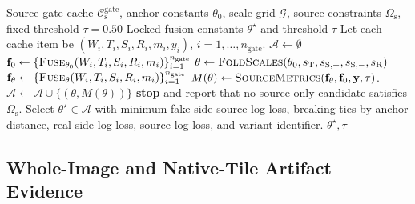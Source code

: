 \documentclass[letterpaper,journal]{IEEEtran}
\begin{document}
\begin{algorithm}[t]
\caption{Source-only fusion calibration}
\label{alg:source_locking}
\begin{algorithmic}[1]
\REQUIRE Source-gate cache $\mathcal{C}_{\mathrm{s}}^{\mathrm{gate}}$, anchor constants $\theta_0$, scale grid $\mathcal{G}$, source constraints $\Omega_{\mathrm{s}}$, fixed threshold $\tau=0.50$
\ENSURE Locked fusion constants $\theta^\star$ and threshold $\tau$
\STATE Let each cache item be $(W_i,T_i,S_i,R_i,m_i,y_i)$, $i=1,\ldots,n_{\mathrm{gate}}$.
\STATE $\mathcal{A}\leftarrow\emptyset$
\STATE $\mathbf{f}_{0}\leftarrow\{\textsc{Fuse}_{\theta_0}(W_i,T_i,S_i,R_i,m_i)\}_{i=1}^{n_{\mathrm{gate}}}$
    \STATE $\theta\leftarrow\textsc{FoldScales}(\theta_0,s_{\mathrm{T}},s_{\mathrm{S},+},s_{\mathrm{S},-},s_{\mathrm{R}})$
    \STATE $\mathbf{f}_{\theta}\leftarrow\{\textsc{Fuse}_{\theta}(W_i,T_i,S_i,R_i,m_i)\}_{i=1}^{n_{\mathrm{gate}}}$
    \STATE $M(\theta)\leftarrow\textsc{SourceMetrics}(\mathbf{f}_{\theta},\mathbf{f}_{0},\mathbf{y},\tau)$.
        \STATE $\mathcal{A}\leftarrow\mathcal{A}\cup\{(\theta,M(\theta))\}$
    \ENDIF
\ENDFOR
{}
    \STATE \textbf{stop} and report that no source-only candidate satisfies $\Omega_{\mathrm{s}}$.
\ENDIF
\STATE Select $\theta^\star\in\mathcal{A}$ with minimum fake-side source log loss, breaking ties by anchor distance, real-side log loss, source log loss, and variant identifier.
\RETURN $\theta^\star,\tau$
\end{algorithmic}
\end{algorithm}

\subsection{Whole-Image and Native-Tile Artifact Evidence}
\label{sec:method_artifact}
\end{document}
